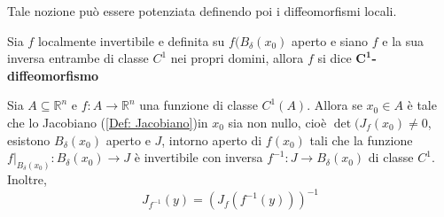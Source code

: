 Tale nozione può essere potenziata definendo poi i diffeomorfismi locali.
\begin{definition} \label{Def: Diffeomorfismo}
    Sia $f$ localmente invertibile e definita su $f(B_\delta(x_0)$ aperto e siano $f$ e la sua inversa entrambe di classe $C^1$ nei propri domini, allora $f$ si dice $\mathbf{C^1}$\textbf{-diffeomorfismo}
\end{definition}
\begin{theorem} \label{Teo: Invertibilità locale}
    Sia $A \subseteq \mathbb{R}^n$ e $f: A \to \mathbb{R}^n$ una funzione di classe $C^1(A)$. Allora se $x_0 \in A$ è tale che lo Jacobiano (\ref{Def: Jacobiano})in $x_0$ sia non nullo, cioè $\det(J_f(x_0) \neq 0$, esistono $B_\delta(x_0)$ aperto e $J$, intorno aperto di $f(x_0)$ tali che la funzione $f\big|_{B_\delta(x_0)}: B_\delta(x_0) \to J$ è invertibile con inversa $f^{-1}: J \to B_\delta(x_0)$ di classe $C^1$. Inoltre, 
    \begin{equation}
        J_{f^{-1}}(y)=(J_f(f^{-1}(y)))^{-1}
    \end{equation}
\end{theorem}
